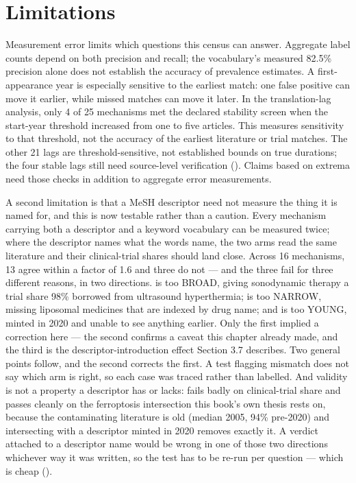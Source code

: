 \documentclass[11pt,twoside,openright]{report}
\begin{document}
\section{Limitations}

Measurement error limits which questions this census can answer. Aggregate label counts depend on both precision and recall; the vocabulary's measured 82.5\% precision alone does not establish the accuracy of prevalence estimates. A first-appearance year is especially sensitive to the earliest match: one false positive can move it earlier, while missed matches can move it later. In the translation-lag analysis, only 4 of 25 mechanisms met the declared stability screen when the start-year threshold increased from one to five articles. This measures sensitivity to that threshold, not the accuracy of the earliest literature or trial matches. The other 21 lags are threshold-sensitive, not established bounds on true durations; the four stable lags still need source-level verification (). Claims based on extrema need those checks in addition to aggregate error measurements.

A second limitation is that a MeSH descriptor need not measure the thing it is named for, and this is now testable rather than a caution. Every mechanism carrying both a descriptor and a keyword vocabulary can be measured twice; where the descriptor names what the words name, the two arms read the same literature and their clinical-trial shares should land close. Across 16 mechanisms, 13 agree within a factor of 1.6 and three do not --- and the three fail for three different reasons, in two directions.  is too BROAD, giving sonodynamic therapy a trial share 98\% borrowed from ultrasound hyperthermia;  is too NARROW, missing liposomal medicines that are indexed by drug name; and  is too YOUNG, minted in 2020 and unable to see anything earlier. Only the first implied a correction here --- the second confirms a caveat this chapter already made, and the third is the descriptor-introduction effect Section 3.7 describes. Two general points follow, and the second corrects the first. A test flagging mismatch does not say which arm is right, so each case was traced rather than labelled. And validity is not a property a descriptor has or lacks:  fails badly on clinical-trial share and passes cleanly on the ferroptosis intersection this book's own thesis rests on, because the contaminating literature is old (median 2005, 94\% pre-2020) and intersecting with a descriptor minted in 2020 removes exactly it. A verdict attached to a descriptor name would be wrong in one of those two directions whichever way it was written, so the test has to be re-run per question --- which is cheap ().
\end{document}
